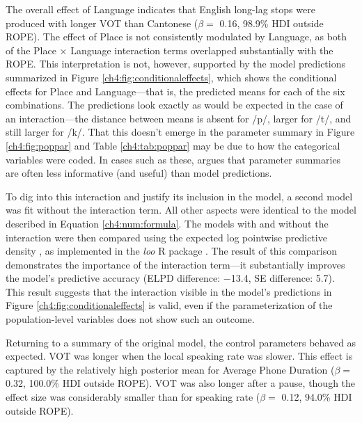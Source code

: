 The overall effect of Language indicates that English long-lag stops were produced with longer VOT than Cantonese ($\beta =$ 0.16, 98.9\% HDI outside ROPE). The effect of Place is not consistently modulated by Language, as both of the Place $\times$ Language interaction terms overlapped substantially with the ROPE. This interpretation is not, however, supported by the model predictions summarized in Figure \ref{ch4:fig:conditionaleffects}, which shows the conditional effects for Place and Language---that is, the predicted means for each of the six combinations. The predictions look exactly as would be expected in the case of an interaction---the distance between means is absent for /p/, larger for /t/, and still larger for /k/. That this doesn't emerge in the parameter summary in Figure \ref{ch4:fig:poppar} and Table \ref{ch4:tab:poppar} may be due to how the categorical variables were coded. In cases such as these, \citet{mcelreath_2020_sr} argues that parameter summaries are often less informative (and useful) than model predictions. 

To dig into this interaction and justify its inclusion in the model, a second model was fit without the interaction term. All other aspects were identical to the model described in Equation \ref{ch4:num:formula}. The models with and without the interaction were then compared using the expected log pointwise predictive density \citep[ELPD][]{vehtari_2017_practical}, as implemented in the \textit{loo} R package \citep{vehtari_2020_loo}. The result of this comparison demonstrates the importance of the interaction term---it substantially improves the model's predictive accuracy (ELPD difference: $-$13.4, SE difference: 5.7). This result suggests that the interaction visible in the model's predictions in Figure \ref{ch4:fig:conditionaleffects} is valid, even if the parameterization of the population-level variables does not show such an outcome. 

Returning to a summary of the original model, the control parameters behaved as expected. VOT was longer when the local speaking rate was slower. This effect is captured by the relatively high posterior mean for Average Phone Duration ($\beta =$ 0.32, 100.0\% HDI outside ROPE). VOT was also longer after a pause, though the effect size was considerably smaller than for speaking rate ($\beta =$ 0.12, 94.0\% HDI outside ROPE).

